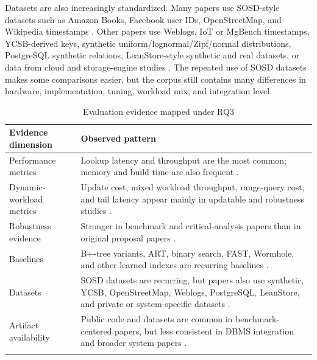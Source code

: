 \documentclass[a4paper, 12pt, twoside]{report}
\begin{document}
Datasets are also increasingly standardized. Many papers use SOSD-style datasets such as Amazon Books, Facebook user IDs, OpenStreetMap, and Wikipedia timestamps \cite{marcus2020benchmarking,kipf2020radixspline,maltry2022critical,sun2023learned,li2023dili,liang2024swix}. Other papers use Weblogs, IoT or MgBench timestamps, YCSB-derived keys, synthetic uniform/lognormal/Zipf/normal distributions, PostgreSQL synthetic relations, LeanStore-style synthetic and real datasets, or data from cloud and storage-engine studies \cite{kraska2018,galakatos2019fiting,ferragina2020pgm,ding2020alex,zhang2022carmi,lan2023disk,maharjan2023learnedstore,chatterjee2024limousine,fuad2026postlearn}. The repeated use of SOSD datasets makes some comparisons easier, but the corpus still contains many differences in hardware, implementation, tuning, workload mix, and integration level.

\begin{longtable}{|p{4cm}|p{8.8cm}|}
\hline
\textbf{Evidence dimension} & \textbf{Observed pattern} \\
\hline
Performance metrics & Lookup latency and throughput are the most common; memory and build time are also frequent \cite{marcus2020benchmarking,sun2023learned}. \\
\hline
Dynamic-workload metrics & Update cost, mixed workload throughput, range-query cost, and tail latency appear mainly in updatable and robustness studies \cite{ding2020alex,wongkham2022ready,lan2023disk,luo2025robustness}. \\
\hline
Robustness evidence & Stronger in benchmark and critical-analysis papers than in original proposal papers \cite{wongkham2022ready,sun2023learned,luo2025robustness}. \\
\hline
Baselines & B+-tree variants, ART, binary search, FAST, Wormhole, and other learned indexes are recurring baselines \cite{kraska2018,marcus2020benchmarking,sun2023learned}. \\
\hline
Datasets & SOSD datasets are recurring, but papers also use synthetic, YCSB, OpenStreetMap, Weblogs, PostgreSQL, LeanStore, and private or system-specific datasets \cite{marcus2020benchmarking,lan2023disk,maharjan2023learnedstore,fuad2026postlearn}. \\
\hline
Artifact availability & Public code and datasets are common in benchmark-centered papers, but less consistent in DBMS integration and broader system papers \cite{marcus2020benchmarking,wongkham2022ready,sun2023learned,lan2023disk,luo2025robustness,fuad2026postlearn}. \\
\hline
\caption{Evaluation evidence mapped under RQ3}
\label{tab:evaluation-map}
\end{longtable}
\end{document}
